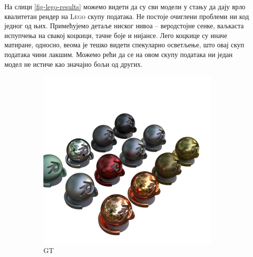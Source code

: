 \documentclass[12pt, a4paper, twoside]{book}
\numberwithin{equation}{chapter}
\numberwithin{theorem}{section}
\numberwithin{definition}{section}
\numberwithin{definitionChapter}{chapter}
\begin{document}
На слици \ref{fig-lego-results} можемо видети да су сви модели у стању да дају врло квалитетан рендер
на \textsc{Lego} скупу података.
Не постоје очиглени проблеми ни код једног од њих. Примећујемо детаље ниског нивоа -- веродстојне сенке,
ваљкаста испупчења на свакој коцкици, тачне боје и нијансе. Лего коцкице су иначе матиране, односно, веома је тешко
видети спекуларно осветљење, што овај скуп података чини лакшим. Можемо рећи да се на овом скупу података ни један
модел не истиче као значајно бољи од других.

	\begin{figure}[H]
		\centering
		\begin{subfigure}{0.475\textwidth}
			\centering
			\includegraphics[scale=0.25]{img/gt/gt_materials_36.png}
			\caption{GT}
		\end{subfigure}
		\begin{subfigure}{0.475\textwidth}
			\centering

\end{subfigure}
\end{figure}
\end{document}
